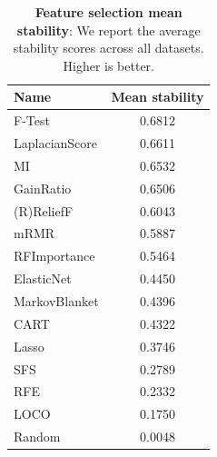 \begin{table}[ht]
\caption{\textbf{Feature selection mean stability}: We report the average stability scores across all datasets. Higher is better.}
\label{table-results-stability}
\centering
\small
\begin{tabular}{lc}
\toprule
\textbf{Name} & \textbf{Mean stability} \\
\midrule
F-Test & 0.6812 \\
LaplacianScore & 0.6611 \\
MI & 0.6532 \\
GainRatio & 0.6506 \\
(R)ReliefF & 0.6043 \\
mRMR & 0.5887 \\
RFImportance & 0.5464 \\
ElasticNet & 0.4450 \\
MarkovBlanket & 0.4396 \\
CART & 0.4322 \\
Lasso & 0.3746 \\
SFS & 0.2789 \\
RFE & 0.2332 \\
LOCO & 0.1750 \\
Random & 0.0048 \\
\bottomrule
\end{tabular}
\end{table}